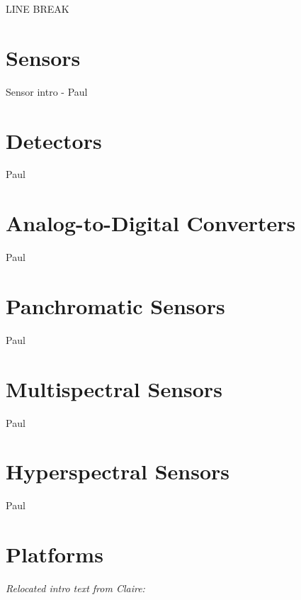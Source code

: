 \documentclass[
]{book}
\begin{document}
LINE BREAK

\hypertarget{sensors}{%
\section{Sensors}\label{sensors}}

Sensor intro - Paul

\hypertarget{detectors}{%
\section{Detectors}\label{detectors}}

Paul

\hypertarget{analog-to-digital-converters}{%
\section{Analog-to-Digital Converters}\label{analog-to-digital-converters}}

Paul

\hypertarget{panchromatic-sensors}{%
\section{Panchromatic Sensors}\label{panchromatic-sensors}}

Paul

\hypertarget{multispectral-sensors}{%
\section{Multispectral Sensors}\label{multispectral-sensors}}

Paul

\hypertarget{hyperspectral-sensors}{%
\section{Hyperspectral Sensors}\label{hyperspectral-sensors}}

Paul

\hypertarget{platforms}{%
\section{Platforms}\label{platforms}}

\emph{\emph{Relocated intro text from Claire:}}
\end{document}

